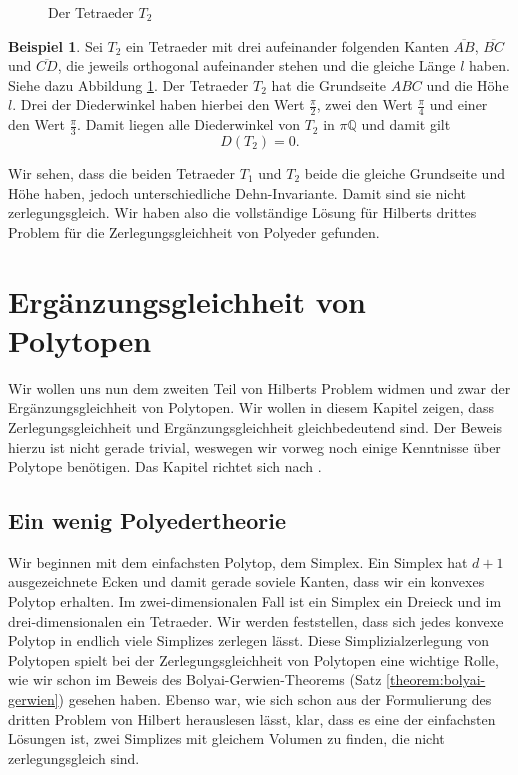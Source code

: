 \documentclass[11pt,titlepage]{article}
\newcommand{\setQ}{\mathbb{Q}}
\theoremstyle{definition}
\newtheorem{example}[theorem]{Beispiel}
\theoremstyle{remark}
\begin{document}
\begin{figure}[!htbp]
\begin{minipage}[m]{0.4\textwidth}
			\caption{Der Tetraeder $T_2$}
			\label{Abb.6}
		\end{minipage}
	\end{figure}

	\begin{example}
		Sei $T_2$ ein Tetraeder mit drei aufeinander folgenden Kanten 
		$\overline{AB}$, $\overline{BC}$ und $\overline{CD}$, die jeweils 
		orthogonal aufeinander stehen und die gleiche Länge $l$ haben. 
		Siehe dazu Abbildung \ref{Abb.6}. 
		Der Tetraeder $T_2$ hat die Grundseite $ABC$ und die Höhe $l$. 
		Drei der Diederwinkel haben hierbei den Wert $\frac{\pi}{2}$, 
		zwei den Wert $\frac{\pi}{4}$ und einer den Wert $\frac{\pi}{3}$. 
		Damit liegen alle Diederwinkel von $T_2$ in $\pi\setQ$ und damit 
		gilt 
		\[D(T_2)=0.\]
	\end{example}
	
	Wir sehen, dass die beiden Tetraeder $T_1$ und $T_2$ beide die 
	gleiche Grundseite und Höhe haben, jedoch unterschiedliche Dehn-Invariante. 
	Damit sind sie nicht zerlegungsgleich. Wir haben also die vollständige 
	Lösung für Hilberts drittes Problem für die Zerlegungsgleichheit von 
	Polyeder gefunden.
	
	\newpage
	
	\section{Ergänzungsgleichheit von Polytopen}
	
	Wir wollen uns nun dem zweiten Teil von Hilberts Problem widmen und zwar der 
	Ergänzungsgleichheit von Polytopen. Wir wollen in diesem Kapitel zeigen, dass 
	Zerlegungsgleichheit und Ergänzungsgleichheit gleichbedeutend sind. Der 
	Beweis hierzu ist nicht gerade trivial, weswegen wir vorweg noch einige 
	Kenntnisse über Polytope benötigen. Das Kapitel richtet sich nach 
	\cite{Hadwiger}. 
	
	\subsection{Ein wenig Polyedertheorie}
	
	Wir beginnen mit dem einfachsten Polytop, dem Simplex. Ein Simplex hat 
	$d+1$ ausgezeichnete Ecken und damit gerade soviele Kanten, dass 
	wir ein konvexes Polytop erhalten. Im zwei-dimensionalen Fall ist ein 
	Simplex ein Dreieck und im drei-dimensionalen ein Tetraeder. Wir werden 
	feststellen, dass sich jedes konvexe Polytop in endlich viele Simplizes 
	zerlegen lässt. Diese Simplizialzerlegung von Polytopen spielt bei 
	der Zerlegungsgleichheit von Polytopen eine wichtige Rolle, wie wir schon im 
	Beweis des Bolyai-Gerwien-Theorems (Satz \ref{theorem:bolyai-gerwien}) 
	gesehen haben. Ebenso war, wie sich schon aus der Formulierung des dritten Problem von Hilbert herauslesen lässt, klar, dass es eine der einfachsten Lösungen ist, zwei Simplizes mit gleichem Volumen zu finden, die nicht zerlegungsgleich sind.
	
\end{document}
